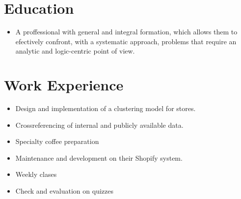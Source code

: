 \documentclass{my_cv}
\begin{document}
\makecvtitle

\vspace*{-1cm}

\section{Education \faBook} 
\begin{itemize}
\item A proffessional with general and integral formation, which allows them to efectively confront, with a systematic approach, problems that require an analytic and logic-centric point of view. 
\end{itemize}

\section{Work Experience \faSuitcase}
\begin{itemize}
\item Design and implementation of a clustering model for stores.
\item Crossreferencing of internal and publicly available data.
\end{itemize}
\begin{itemize}
\item Specialty coffee preparation
\item Maintenance and development on their Shopify system.
\end{itemize}
\begin{itemize}
\item Weekly clases
\item Check and evaluation on quizzes 
\end{itemize}
\end{document}
